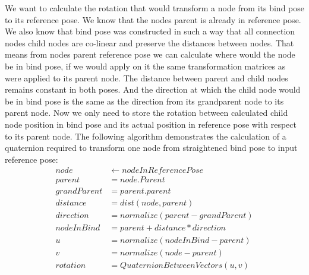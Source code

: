 We want to calculate the rotation that would transform a node from its bind pose to its reference pose.
We know that the nodes parent is already in reference pose.
We also know that bind pose was constructed in such a way that all connection nodes child nodes are co-linear and preserve the distances between nodes.
That means from nodes parent reference pose we can calculate where would the node be in bind pose, if we would apply on it the same transformation matrices as were applied to its parent node.
The distance between parent and child nodes remains constant in both poses. And the direction at which the child node would be in bind pose is the same as the direction from its grandparent node to its parent node.
Now we only need to store the rotation between calculated child node position in bind pose and its actual position in reference pose with respect to its parent node.
The following algorithm demonstrates the calculation of a quaternion required to transform one node from straightened bind pose to input reference pose:
\begin{align*}
node& \leftarrow nodeInReferencePose \\
parent& = node.Parent \\
grandParent& = parent.parent \\
distance& = dist(node, parent) \\
direction& = normalize(parent - grandParent) \\
nodeInBind& = parent + distance * direction \\
u& = normalize(nodeInBind - parent) \\
v& = normalize(node - parent) \\
rotation& = QuaternionBetweenVectors(u, v)
\end{align*}



